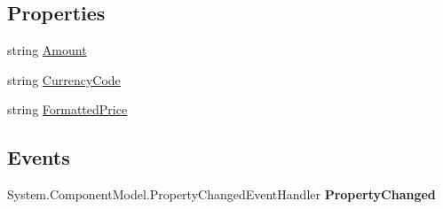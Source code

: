 \subsection*{Properties}
\begin{DoxyCompactItemize}
\item 
\hypertarget{class_price___comparison_1_1amazon_1_1ecs_1_1_price_ac056949b04fe45a5e21e81fae0add229}{string \hyperlink{class_price___comparison_1_1amazon_1_1ecs_1_1_price_ac056949b04fe45a5e21e81fae0add229}{Amount}}\label{class_price___comparison_1_1amazon_1_1ecs_1_1_price_ac056949b04fe45a5e21e81fae0add229}

\begin{DoxyCompactList}\small\item\em \end{DoxyCompactList}\item 
\hypertarget{class_price___comparison_1_1amazon_1_1ecs_1_1_price_ae2d693062ab674d4a945278a43f4b270}{string \hyperlink{class_price___comparison_1_1amazon_1_1ecs_1_1_price_ae2d693062ab674d4a945278a43f4b270}{Currency\-Code}}\label{class_price___comparison_1_1amazon_1_1ecs_1_1_price_ae2d693062ab674d4a945278a43f4b270}

\begin{DoxyCompactList}\small\item\em \end{DoxyCompactList}\item 
\hypertarget{class_price___comparison_1_1amazon_1_1ecs_1_1_price_a014df7c0ec469f13d9033206bc34cb79}{string \hyperlink{class_price___comparison_1_1amazon_1_1ecs_1_1_price_a014df7c0ec469f13d9033206bc34cb79}{Formatted\-Price}}\label{class_price___comparison_1_1amazon_1_1ecs_1_1_price_a014df7c0ec469f13d9033206bc34cb79}

\begin{DoxyCompactList}\small\item\em \end{DoxyCompactList}\end{DoxyCompactItemize}
\subsection*{Events}
\begin{DoxyCompactItemize}
\item 
\hypertarget{class_price___comparison_1_1amazon_1_1ecs_1_1_price_a81688a1baa4111094ab3843b6649489f}{System.\-Component\-Model.\-Property\-Changed\-Event\-Handler {\bfseries Property\-Changed}}\label{class_price___comparison_1_1amazon_1_1ecs_1_1_price_a81688a1baa4111094ab3843b6649489f}

\end{DoxyCompactItemize}
